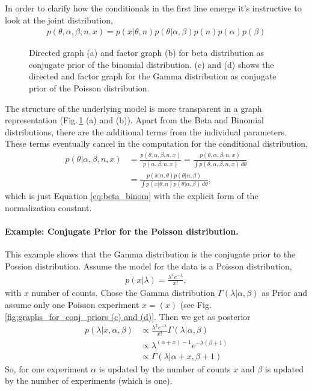 In order to clarify how the conditionals in the first line emerge it's instructive to look at the joint distribution,
\begin{align*}
p(\theta, \alpha, \beta, n, x) = p(x|\theta, n) p(\theta|\alpha, \beta) p(n) p(\alpha) p(\beta)
\end{align*}
\begin{figure}

\caption{\label{fig:graphs_for_conj_priors}Directed graph (a) and factor graph (b) for beta distribution as conjugate prior of the binomial distribution. (c) and (d) shows the directed and factor graph for the Gamma distribution as conjugate prior of the Poisson distribution.}
\end{figure}
The structure of the underlying model is more transparent in a graph representation (Fig.\,\ref{fig:graphs_for_conj_priors} (a) and (b)). Apart from the Beta and Binomial distributions, there are the additional terms from the individual parameters. These terms eventually cancel in the computation for the conditional distribution,
\begin{align*}
p(\theta | \alpha, \beta, n, x)  &= \frac{p(\theta, \alpha, \beta, n, x)}{p(\alpha, \beta, n, x)} = \frac{p(\theta, \alpha, \beta, n, x)}{\int p(\theta, \alpha, \beta, n, x)\,d\theta} \\ &= \frac{p(x|n, \theta) p(\theta|\alpha, \beta)}{\int p(x|\theta, n) p(\theta|\alpha, \beta) \,d\theta},
\end{align*} 
which is just Equation \ref{eq:beta_binom} with the explicit form of the normalization constant.
\paragraph*{Example: Conjugate Prior for the Poisson distribution.} This example shows that the Gamma distribution is the conjugate prior to the Possion distribution. Assume the model for the data is a Poisson distribution,
\begin{align}
p(x|\lambda)= \frac{\lambda^x e^{-\lambda}}{x!},
\end{align}   
with $x$ number of counts. Chose the Gamma distribution $\Gamma(\lambda|\alpha, \beta)$  as Prior and assume only one Poisson experiment $x=(x)$ (see Fig.\,\ref{fig:graphs_for_conj_priors (c) and (d)}. Then we get as posterior
\begin{align}
p(\lambda|x, \alpha, \beta)  
&\propto  \frac{\lambda^x e^{-\lambda}}{x!} \Gamma(\lambda|\alpha, \beta) \\
&\propto \lambda^{(\alpha + x) - 1} e^{-\lambda(\beta +1)} \\
&\propto \Gamma(\lambda | \alpha + x, \beta +1)
\end{align} 
So, for one experiment $\alpha$ is updated by the number of counts  $x$  and $\beta$ is updated by the number of experiments (which is one). 


